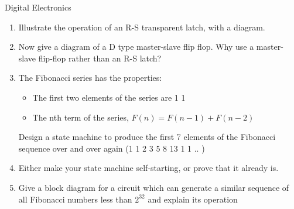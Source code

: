 \documentclass{tripos}  %
\begin{document}
\begin{question}[MockIA,year=2024,paper=1,question=2,author=rrw]{Digital Electronics}


\begin{enumerate}
\item Illustrate the operation of an R-S transparent latch, with a diagram. 
\item Now give a diagram of a D type master-slave flip flop. Why use a master-slave flip-flop rather than an R-S latch? 
\item
  The Fibonacci series has the properties:

\begin{itemize}
\item The first two elements of the series are 1 1
\item The nth term of the series, $F(n) = F(n-1)+ F(n-2)$
\end{itemize}

Design a state machine to produce the first 7 elements of the Fibonacci sequence over and over again (1 1 2 3 5 8 13 1 1 .. ) 
\item Either make your state machine self-starting, or prove that it already is. 
\item Give a block diagram for a circuit which can generate a similar sequence of all Fibonacci numbers less than $2^{32}$ and explain its operation 
\end{enumerate}

\end{question}
\end{document}
